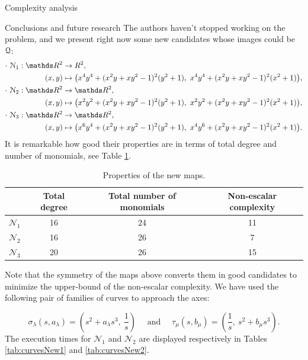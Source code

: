 \documentclass[11pt, a4paper, english, twoside, notitlepage, openright]{report}
\begin{document}
\begin{chapter}{Complexity analysis}
\begin{section}{Conclusions and future research}
The authors haven't stopped working on the problem, and we present right now some new candidates whose images could be $\mathcal{Q}$:
\begin{align*}
\cdot\ \mathcal{N}_1:\R^2 &\to R^2, \\
(x,y)&\mapsto\big(x^4y^4+(x^2y+xy^2-1)^2(y^2+1),\ x^4y^4+(x^2y+xy^2-1)^2(x^2+1)\big),\\
\cdot\ \mathcal{N}_2:\R^2 &\to \R^2, \\
(x,y)&\mapsto\big(x^2y^2+(x^2y+xy^2-1)^2(y^2+1),\ x^2y^2+(x^2y+xy^2-1)^2(x^2+1)\big),\\
\cdot\ \mathcal{N}_3:\R^2 &\to \R^2, \\
(x,y)&\mapsto\big(x^6y^4+(x^2y+xy^2-1)^2(y^2+1),\ x^4y^6+(x^2y+xy^2-1)^2(x^2+1)\big).
\end{align*}
It is remarkable how good their properties are in terms of total degree and number of monomials, see Table \ref{tab:newDegreeMon}.

\begin{table}[ht!]
\begin{center}
\begin{tabular}{c || c | c | c}
& Total degree & Total number of monomials & Non-escalar complexity\\ \hline \hline
$\mathcal{N}_1$&16&24&11 \\ \hline
$\mathcal{N}_2$&16&26&7 \\ \hline
$\mathcal{N}_3$&20&26&15 \\	
\end{tabular}
\caption{Properties of the new maps.}\label{tab:newDegreeMon}
\end{center}
\end{table}
Note that the symmetry of the maps above converts them in good candidates to minimize the upper-bound of the non-escalar complexity. We have used the following pair of families of curves to approach the axes:

$$
\sigma_\lambda(s, a_\lambda) = \left(s^2 + a_\lambda s^3,\ \frac{1}{s}\right)
\quad \text{ and } \quad
\tau_\mu(s, b_\mu) = \left(\frac{1}{s},\ s^2 + b_\mu s^3\right).
$$
The execution times for $\mathcal{N}_1$ and $\mathcal{N}_2$ are displayed respectively in Tables \ref{tab:curvesNew1} and \ref{tab:curvesNew2}.


\end{section}
\end{chapter}
\end{document}
